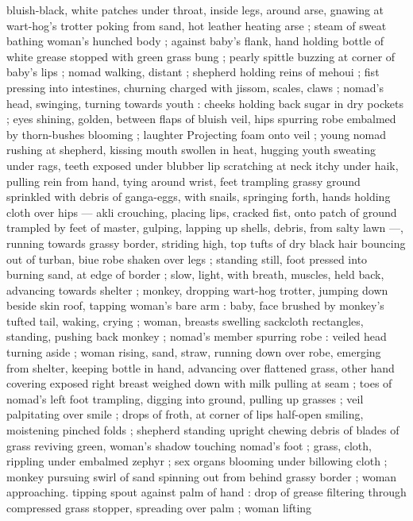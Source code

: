 bluish-black, white patches under throat, inside legs, around arse, 
gnawing at wart-hog's trotter poking from sand, hot leather heating 
arse ; steam of sweat bathing woman's hunched body ; against 
baby's flank, hand holding bottle of white grease stopped with green 
grass bung ; pearly spittle buzzing at corner of baby's lips ; nomad 
walking, distant ; shepherd holding reins of mehoui ; fist pressing 
into intestines, churning charged with jissom, scales, claws ; nomad's 
head, swinging, turning towards youth : cheeks holding back sugar 
in dry pockets ; eyes shining, golden, between flaps of bluish veil, 
hips spurring robe embalmed by thorn-bushes blooming ; laughter 
Projecting foam onto veil ; young nomad rushing at shepherd, kissing 
mouth swollen in heat, hugging youth sweating under rags, teeth 
exposed under blubber lip scratching at neck itchy under haik, 
pulling rein from hand, tying around wrist, feet trampling grassy 
ground sprinkled with debris of ganga-eggs, with snails, springing 
forth, hands holding cloth over hips --- akli crouching, placing lips, 
cracked fist, onto patch of ground trampled by feet of master, 
gulping, lapping up shells, debris, from salty lawn ---, running 
towards grassy border, striding high, top tufts of dry black hair 
bouncing out of turban, biue robe shaken over legs ; standing still, 
foot pressed into burning sand, at edge of border ; slow, light, with 
breath, muscles, held back, advancing towards shelter ; monkey, 
dropping wart-hog trotter, jumping down beside skin roof, tapping 
woman's bare arm : baby, face brushed by monkey's tufted tail, 
waking, crying ; woman, breasts swelling sackcloth rectangles, 
standing, pushing back monkey ; nomad's member spurring robe : 
veiled head turning aside ; woman rising, sand, straw, running down 
over robe, emerging from shelter, keeping bottle in hand, advancing 
over flattened grass, other hand covering exposed right breast 
weighed down with milk pulling at seam ; toes of nomad's left foot 
trampling, digging into ground, pulling up grasses ; veil palpitating 
over smile ; drops of froth, at corner of lips half-open smiling, 
moistening pinched folds ; shepherd standing upright chewing debris 
of blades of grass reviving green, woman's shadow touching 
nomad's foot ; grass, cloth, rippling under embalmed zephyr ; sex 
organs blooming under billowing cloth ; monkey pursuing swirl of 
sand spinning out from behind grassy border ; woman approaching. 
tipping spout against palm of hand : drop of grease filtering through 
compressed grass stopper, spreading over palm ; woman lifting 
